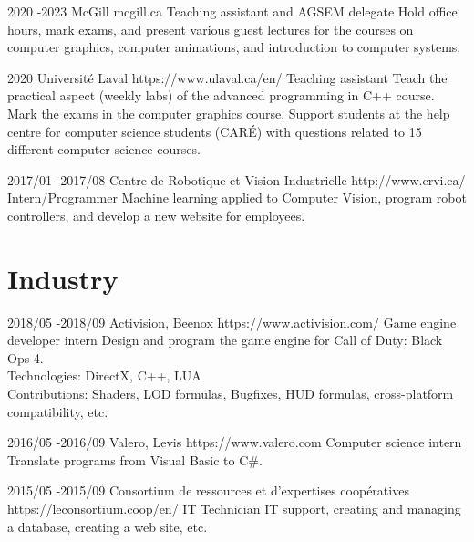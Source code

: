 \documentclass[10pt]{article} %
\begin{document}
\job
{2020  -}{2023}
{McGill}
{mcgill.ca}
{Teaching assistant and AGSEM delegate}
{Hold office hours, mark exams, and present various guest lectures for the courses on computer graphics, computer animations, and introduction to computer systems.}

\job
{}{2020}
{Université Laval}
{https://www.ulaval.ca/en/}
{Teaching assistant}
{Teach the practical aspect (weekly labs) of the advanced programming in C++ course. Mark the exams in the computer graphics course. Support students at the help centre for computer science students (CARÉ) with questions related to 15 different computer science courses.}


\job
{2017/01 -}{2017/08}
{Centre de Robotique et Vision Industrielle}
{http://www.crvi.ca/}
{Intern/Programmer}
{Machine learning applied to Computer Vision, program robot controllers, and develop a new website for employees.}

\section{Industry}

\job
{2018/05 -}{2018/09}
{Activision, Beenox}
{https://www.activision.com/}
{Game engine developer intern}
{Design and program the game engine for Call of Duty: Black Ops 4.\\
 Technologies: DirectX, C++, LUA \\
 Contributions: Shaders, LOD formulas, Bugfixes, HUD formulas, cross-platform compatibility, etc.}

\job
{2016/05 -}{2016/09}
{Valero, Levis}
{https://www.valero.com}
{Computer science intern}
{Translate programs from Visual Basic to C\#.}

\job
{2015/05 -}{2015/09}
{Consortium de ressources et d'expertises coopératives}
{https://leconsortium.coop/en/}
{IT Technician}
{IT support, creating and managing a database, creating a web site, etc.}



\end{document}
